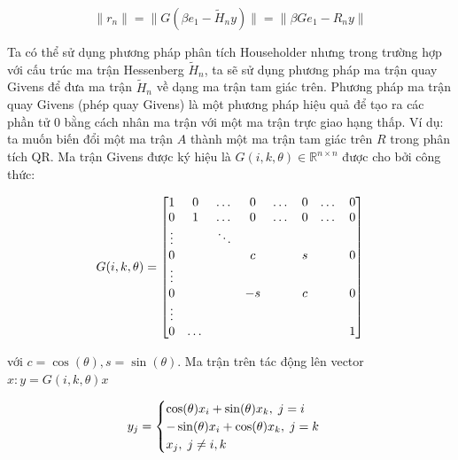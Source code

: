 \documentclass[14pt, a4paper]{article}
\numberwithin{equation}{section}
\numberwithin{algorithm}{section}
\numberwithin{figure}{section}
\numberwithin{dl}{section}
\numberwithin{md}{section}
\numberwithin{bd}{section}
\numberwithin{dn}{section}
\begin{document}
\begin{equation} \label{eq:Givens-Apply}
    \lVert r_n \rVert = \lVert G(\beta e_1 - \widetilde{H}_n y) \rVert = \lVert \beta G e_1 - R_n y \rVert
\end{equation}


Ta có thể sử dụng phương pháp phân tích Householder nhưng trong trường hợp với cấu trúc ma trận Hessenberg $\widetilde{H}_n$, ta sẽ sử dụng phương pháp ma trận quay Givens để đưa ma trận $\widetilde{H}_n$ về dạng ma trận tam giác trên.
Phương pháp ma trận quay Givens (phép quay Givens) là một phương pháp hiệu quả để tạo ra các phần tử 0 bằng cách nhân ma trận với một ma trận trực giao hạng thấp. Ví dụ: ta muốn biến đổi một ma trận $A$ thành một ma trận tam giác trên $R$ trong phân tích QR.
Ma trận Givens được ký hiệu là $G(i, k, \theta) \in \mathbb{R}^{n \times n}$ được cho bởi công thức:

\begin{equation} \label{eq:Givens-Rotation-Matrix}
    G(i, k, \theta) = \begin{bmatrix} 1 & 0 & \dots & 0 & \dots & 0 & \dots & 0 \\
                                    0 & 1 & \dots & 0 & \dots & 0 & \dots & 0 \\
                                    \vdots & \thickspace & \ddots & \thickspace & \thickspace & \thickspace & \thickspace \\
                                    0 & \thickspace & \space & c & \thickspace & s & \thickspace & 0 \\
                                    \vdots \\
                                    0 & \thickspace & \space & -s & \thickspace & c & \thickspace & 0 \\
                                    \vdots \\
                                    0 & \dots & \thickspace & \thickspace & \thickspace & \thickspace & \space & 1    \end{bmatrix}
\end{equation}

với $c = \cos(\theta), s = \sin(\theta)$. Ma trận trên tác động lên vector $x: y=G(i, k, \theta)x$

\begin{equation} \label{eq:Rotation-Result}
    y_j = \begin{cases}
        \cos(\theta) x_i + \sin(\theta) x_k, \thickspace j = i \\
        -\sin(\theta) x_i + \cos(\theta) x_k, \thickspace j = k \\
        x_j, \thickspace j \neq i, k
    \end{cases}
\end{equation}
\end{document}

